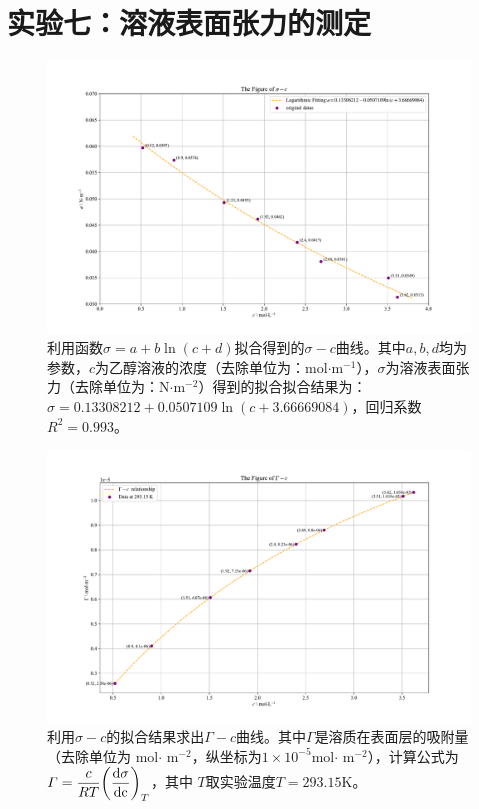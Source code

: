 \documentclass[UTF8,AutoFakeBold,a4paper]{article}
\begin{document}
\section{实验七：溶液表面张力的测定}
\newpage
\begin{figure}[h]
	\centering
	\includegraphics[scale=0.4]{Figure1}
	\caption{利用函数$\sigma = a + b \ln{(c + d)}$拟合得到的$\sigma - c$曲线。其中$a,b,d$均为参数，$c$为乙醇溶液的浓度（去除单位为：mol$\cdot$m$^{-1}$），$\sigma$为溶液表面张力（去除单位为：N$\cdot$m$^{-2}$）得到的拟合拟合结果为：\textcolor[rgb]{0.54,0.13,0.33}{$ \sigma= 0.13308212+0.0507109\ln{(c + 3.66669084)}$}，回归系数$R^{2} = 0.993$。}
	\label{fi2}
\end{figure}
\begin{figure}[h]
	\centering
	\includegraphics[scale=0.4]{Figure2}
	\caption{利用$\sigma - c$的拟合结果求出$\varGamma - c$曲线。其中$\varGamma$是溶质在表面层的吸附量（去除单位为 mol$\cdot$ m$^{-2}$，纵坐标为$1\times 10^{-5}$mol$\cdot$ m$^{-2}$），计算公式为\textcolor[rgb]{0.07,0.36,0.57}{$\varGamma = \dfrac{c}{RT}\pqty{\dfrac{\rm{d}\sigma}{\rm{d}c}}_{T}$}，其中 $T$取实验温度$T = 293.15$K。}
	\label{fi3}
\end{figure}
\end{document}
